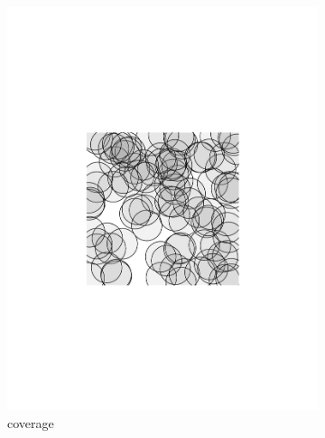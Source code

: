 \begin{figure}%
	\centering
    \begin{subfigure}{0.3\textwidth}
      \includegraphics[width=\textwidth]{figures/coverage-30--0-static1}
      \caption{coverage}\label{fig:setup1}
    \end{subfigure}
    \begin{subfigure}{0.3\textwidth}

\end{subfigure}
\end{figure}
